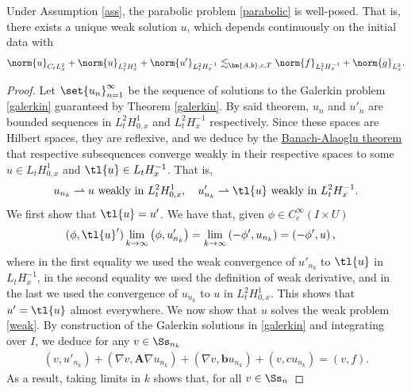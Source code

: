 \documentclass[
    a4paper,
    DIV=14,
    abstract=true,
    numbers=noenddot
]{scrartcl}
\begin{document}
\begin{theorem}
 Under Assumption \ref{ass}, the parabolic problem \eqref{parabolic} is well-posed. That is, there exists a unique weak solution $u$, which depends continuously on the initial data with
  \begin{align}\label{bound P}
    \norm{u}_{C_t L_x^2} +\norm{u}_{L^2_tH_{x}^1} + \norm{u'}_{L^2_tH_{x}^{-1}} \lesssim_{\bm{A,b},c,T} \norm{f}_{L^2_t H_x^{-1}}+ \norm{g}_{L_x^2}.
  \end{align}
\end{theorem}
\begin{proof}
 Let $\set{u_n}_{n=1}^\infty$ be the sequence of solutions to the Galerkin problem \eqref{galerkin} guaranteed by Theorem \eqref{galerkin}. By said theorem, $u_n$ and $u'_n$ are bounded sequences in $L_t^2H_{0,x}^1$ and $L_t^2 H_x^{-1}$ respectively. Since these spaces are Hilbert spaces, they are reflexive, and we deduce by the \href{https://en.wikipedia.org/wiki/Banach%E2%80%93Alaoglu_theorem}{Banach-Alaoglu theorem} that respective subsequences converge weakly in their respective spaces to some $u \in L_tH_{0,x}^1$ and $\tl{u} \in L_t H_x^{-1}$. That is, 
  \begin{align*}
u_{n_k} \rightharpoonup u \text{ weakly in } L_t^2H_{0,x}^1, \quad u_{n_k}' \rightharpoonup \tl{u} \text{ weakly in } L_t^2 H_x^{-1}.
  \end{align*}
 We first show that $\tl{u} = u'$. We have that, given $\phi \in C_c^\infty(I \times U)$
  \begin{align*}
 (\phi,\tl{u}')\lim_{k \to \infty} \left(\phi, u_{n_k}'\right) & = \lim_{k \to \infty} \left(-\phi', u_{n_k}\right) = \left(-\phi', u\right) ,
  \end{align*}
 where in the first equality we used the weak convergence of $u'_{n_k}$ to $\tl{u}$ in $L_t H_x^{-1}$, in the second equality we used the definition of weak derivative, and in the last we used the convergence of $u_{n_k}$ to $u$ in $L_t^2H_{0,x}^1$. This shows that $u' = \tl{u}$ almost everywhere. We now show that $u$ solves the weak problem \eqref{weak}. By construction of the Galerkin solutions in \eqref{galerkin} and integrating over $I$, we deduce for any $v \in \Ss_{n_k}$ 
  \begin{align}\label{weak k}
 (v, u'_{n_k})+ (\nabla v, \bm{A} \nabla u_{n_k}) + (\nabla v, \bm{b} u_{n_k}) + (v, cu_{n_k}) = (v, f).
  \end{align}
 As a result, taking limits in $k$ shows that, for all $v \in \Ss _n$

\end{proof}
\end{document}

